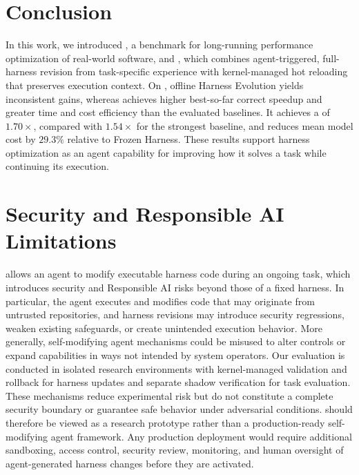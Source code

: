 \section{Conclusion}
\label{sec:conclusion}

In this work, we introduced \perfrace{}, a benchmark for long-running performance optimization of real-world software, and \boxbox{}, which combines agent-triggered, full-harness revision from task-specific experience with kernel-managed hot reloading that preserves execution context. On \perfrace{}, offline Harness Evolution yields inconsistent gains, whereas \boxbox{} achieves higher best-so-far correct speedup and greater time and cost efficiency than the evaluated baselines. It achieves a  of \(1.70\times\), compared with \(1.54\times\) for the strongest baseline, and reduces mean model cost by \(29.3\%\) relative to Frozen Harness. These results support harness optimization as an agent capability for improving how it solves a task while continuing its execution.

\section*{Security and Responsible AI Limitations}

\boxbox{} allows an agent to modify executable harness code during an ongoing task, which introduces security and Responsible AI risks beyond those of a fixed harness. In particular, the agent executes and modifies code that may originate from untrusted repositories, and harness revisions may introduce security regressions, weaken existing safeguards, or create unintended execution behavior. More generally, self-modifying agent mechanisms could be misused to alter controls or expand capabilities in ways not intended by system operators. Our evaluation is conducted in isolated research environments with kernel-managed validation and rollback for harness updates and separate shadow verification for task evaluation. These mechanisms reduce experimental risk but do not constitute a complete security boundary or guarantee safe behavior under adversarial conditions. \boxbox{} should therefore be viewed as a research prototype rather than a production-ready self-modifying agent framework. Any production deployment would require additional sandboxing, access control, security review, monitoring, and human oversight of agent-generated harness changes before they are activated.